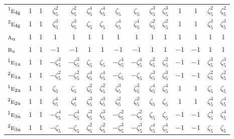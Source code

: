 \documentclass[10pt,a4paper]{article}
\numberwithin{equation}{section}
\newcommand{\irr}[1]{\text{\normalfont\scshape #1}}
\newcommand{\conjpair}[1]{{}^{#1}}
\newcommand{\ptag}[1]{\mathrm{#1}}
\newcommand{\rootunity}[1]{\zeta_{#1}}
\begin{document}
{\begin{longtable}{@{}lcccccccccccccc@{}}
$\conjpair{1}\irr{e}_{4\ptag{g}}$ & $1$ & $1$ & $\rootunity{5}^{2}$ & $\rootunity{5}^{2}$ & $\rootunity{5}^{4}$ & $\rootunity{5}^{4}$ & $\rootunity{5}$ & $\rootunity{5}$ & $\rootunity{5}^{3}$ & $\rootunity{5}^{3}$ & $1$ & $1$ & $\rootunity{5}^{2}$ & $\rootunity{5}^{2}$\\
$\conjpair{2}\irr{e}_{4\ptag{g}}$ & $1$ & $1$ & $\rootunity{5}^{3}$ & $\rootunity{5}^{3}$ & $\rootunity{5}$ & $\rootunity{5}$ & $\rootunity{5}^{4}$ & $\rootunity{5}^{4}$ & $\rootunity{5}^{2}$ & $\rootunity{5}^{2}$ & $1$ & $1$ & $\rootunity{5}^{3}$ & $\rootunity{5}^{3}$\\
$\irr{a}_{\ptag{u}}$ & $1$ & $1$ & $1$ & $1$ & $1$ & $1$ & $1$ & $1$ & $1$ & $1$ & $1$ & $1$ & $1$ & $1$\\
$\irr{b}_{\ptag{u}}$ & $1$ & $1$ & $-1$ & $-1$ & $1$ & $1$ & $-1$ & $-1$ & $1$ & $1$ & $-1$ & $-1$ & $1$ & $1$\\
$\conjpair{1}\irr{e}_{1\ptag{u}}$ & $1$ & $1$ & $-\rootunity{5}^{3}$ & $-\rootunity{5}^{3}$ & $\rootunity{5}$ & $\rootunity{5}$ & $-\rootunity{5}^{4}$ & $-\rootunity{5}^{4}$ & $\rootunity{5}^{2}$ & $\rootunity{5}^{2}$ & $-1$ & $-1$ & $\rootunity{5}^{3}$ & $\rootunity{5}^{3}$\\
$\conjpair{2}\irr{e}_{1\ptag{u}}$ & $1$ & $1$ & $-\rootunity{5}^{2}$ & $-\rootunity{5}^{2}$ & $\rootunity{5}^{4}$ & $\rootunity{5}^{4}$ & $-\rootunity{5}$ & $-\rootunity{5}$ & $\rootunity{5}^{3}$ & $\rootunity{5}^{3}$ & $-1$ & $-1$ & $\rootunity{5}^{2}$ & $\rootunity{5}^{2}$\\
$\conjpair{1}\irr{e}_{2\ptag{u}}$ & $1$ & $1$ & $\rootunity{5}$ & $\rootunity{5}$ & $\rootunity{5}^{2}$ & $\rootunity{5}^{2}$ & $\rootunity{5}^{3}$ & $\rootunity{5}^{3}$ & $\rootunity{5}^{4}$ & $\rootunity{5}^{4}$ & $1$ & $1$ & $\rootunity{5}$ & $\rootunity{5}$\\
$\conjpair{2}\irr{e}_{2\ptag{u}}$ & $1$ & $1$ & $\rootunity{5}^{4}$ & $\rootunity{5}^{4}$ & $\rootunity{5}^{3}$ & $\rootunity{5}^{3}$ & $\rootunity{5}^{2}$ & $\rootunity{5}^{2}$ & $\rootunity{5}$ & $\rootunity{5}$ & $1$ & $1$ & $\rootunity{5}^{4}$ & $\rootunity{5}^{4}$\\
$\conjpair{1}\irr{e}_{3\ptag{u}}$ & $1$ & $1$ & $-\rootunity{5}^{4}$ & $-\rootunity{5}^{4}$ & $\rootunity{5}^{3}$ & $\rootunity{5}^{3}$ & $-\rootunity{5}^{2}$ & $-\rootunity{5}^{2}$ & $\rootunity{5}$ & $\rootunity{5}$ & $-1$ & $-1$ & $\rootunity{5}^{4}$ & $\rootunity{5}^{4}$\\
$\conjpair{2}\irr{e}_{3\ptag{u}}$ & $1$ & $1$ & $-\rootunity{5}$ & $-\rootunity{5}$ & $\rootunity{5}^{2}$ & $\rootunity{5}^{2}$ & $-\rootunity{5}^{3}$ & $-\rootunity{5}^{3}$ & $\rootunity{5}^{4}$ & $\rootunity{5}^{4}$ & $-1$ & $-1$ & $\rootunity{5}$ & $\rootunity{5}$\\

\end{longtable}}
\end{document}

